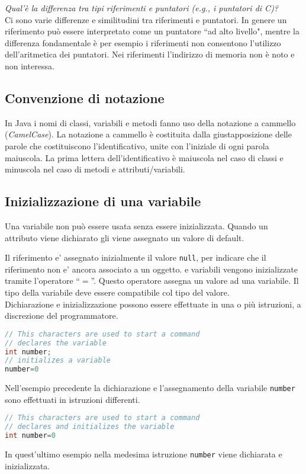 \documentclass{article}
\begin{document}
\emph{Qual'è la differenza tra tipi riferimenti e puntatori (e.g., i puntatori di C)?}\\
Ci sono varie differenze e similitudini tra riferimenti e puntatori. In genere un riferimento può essere interpretato come un puntatore ``ad alto livello", mentre la differenza fondamentale è per esempio i riferimenti non consentono l'utilizzo dell'aritmetica dei puntatori. Nei riferimenti l'indirizzo di memoria non è noto e non interessa.

\subsection{Convenzione di notazione}
In Java i nomi di classi, variabili e metodi fanno uso della notazione a cammello (\emph{CamelCase}).
La notazione a cammello è costituita dalla giustapposizione delle parole che costituiscono l'identificativo, unite con l'iniziale di ogni parola maiuscola. 
La prima lettera dell'identificativo è maiuscola nel caso di classi e minuscola nel caso di metodi e attributi/variabili. 

\subsection{Inizializzazione di una variabile}
Una variabile non può essere usata senza essere inizializzata. Quando un attributo viene dichiarato gli viene assegnato un valore di default.

Il riferimento e' assegnato inizialmente il valore \texttt{null}, per indicare che il riferimento non e' ancora associato a un oggetto.
e variabili vengono inizializzate tramite l'operatore ``$=$''. Questo operatore assegna un valore ad una variabile.
Il tipo della variabile deve essere compatibile col tipo del valore.\\
Dichiarazione e inizializzazione possono essere effettuate in una o  più istruzioni, a discrezione
del programmatore.
\begin{lstlisting}[language=Java,escapechar=|]
// This characters are used to start a command
// declares the variable
int number;
// initializes a variable
number=0
\end{lstlisting}
Nell'esempio precedente la dichiarazione e l'assegnamento della variabile \texttt{number} sono
effettuati in istruzioni differenti.
\begin{lstlisting}[language=Java,escapechar=|]
// This characters are used to start a command
// declares and initializes the variable
int number=0
\end{lstlisting}
In quest'ultimo esempio nella medesima istruzione \texttt{number} viene dichiarata e inizializzata.
\end{document}
